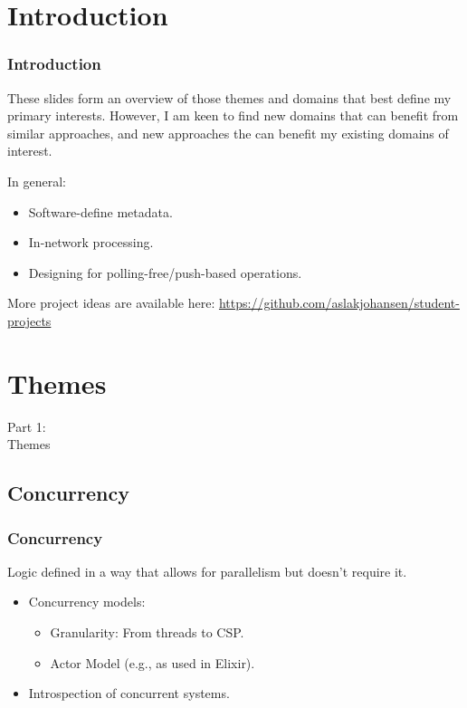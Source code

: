 \section{Introduction}
\begin{frame}
    \frametitle{Introduction}
    \vspace{3mm}
    These slides form an overview of those themes and domains that best define my primary interests. However, I am keen to find new domains that can benefit from similar approaches, and new approaches the can benefit my existing domains of interest.
    
    \vspace{3mm}
    In general:
    \begin{itemize}
      \item Software-define metadata.
      \item In-network processing.
      \item Designing for polling-free/push-based operations.
    \end{itemize}
    
    \vspace{3mm}
    More project ideas are available here: \url{https://github.com/aslakjohansen/student-projects}
\end{frame}

\section{Themes}
\begin{frame}
    \vspace{25mm}
    \begin{center}
        \Huge{Part 1:\\Themes}
    \end{center}
\end{frame}

\subsection{Concurrency}
\begin{frame}
    \frametitle{Concurrency}
    \vspace{0mm}
    Logic defined in a way that allows for parallelism but doesn't require it.
    \vspace{3mm}
    \begin{itemize}
        \item Concurrency models:
          \begin{itemize}
            \item Granularity: From threads to CSP.
            \item Actor Model (e.g., as used in Elixir).
          \end{itemize}
        \item Introspection of concurrent systems.
    \end{itemize}
\end{frame}


